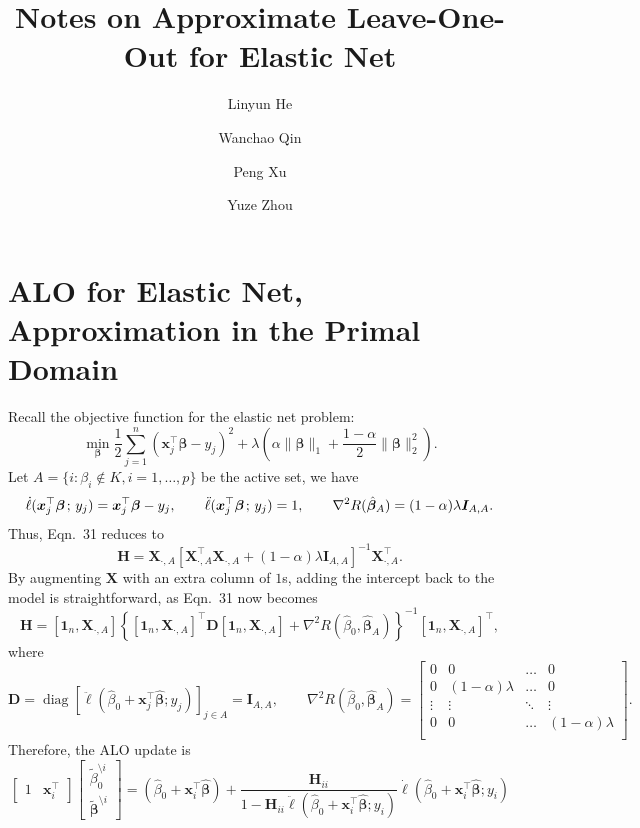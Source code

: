 \documentclass[11pt]{article}
\title{Notes on Approximate Leave-One-Out for Elastic Net}
\author{Linyun He \and Wanchao Qin \and Peng Xu \and Yuze Zhou}
\newcommand{\bx}{\bm{x}}
\newcommand{\bH}{\bm{H}}
\newcommand{\bI}{\bm{I}}
\newcommand{\bX}{\bm{X}}
\newcommand{\bbeta}{\bm{\beta}}
\newcommand{\semicol}{\nobreak\mskip2mu\mathpunct{}\nonscript\mkern-\thinmuskip{;}\mskip6muplus1mu\relax}
\DeclareMathOperator{\diag}{diag}
\newcommand{\refthm}[2]{#1~#2}
\begin{document}
\maketitle

\section{ALO for Elastic Net, Approximation in the Primal Domain}
Recall the objective function for the elastic net problem: \[\min_{\bbeta}\frac{1}{2}\sum_{j=1}^{n}(\bx_j^\top\bbeta-y_j)^2+\lambda\left(\alpha\|\bbeta\|_1+\frac{1-\alpha}{2}\|\bbeta\|_2^2\right).\] Let \(A=\{i:\beta_i\not\in K,i=1,\dotsc,p\}\) be the active set, we have \[\dot{\ell}(\bx_j^\top\bbeta\semicol y_j)=\bx_j^\top\bbeta-y_j,\qquad\ddot{\ell}(\bx_j^\top\bbeta\semicol y_j)=1,\qquad\nabla^2 R(\hat{\bbeta}_A)=(1-\alpha)\lambda\bI_{A,A}.\] Thus, \refthm{Eqn.}{31} reduces to \[\bH=\bX_{\cdot,A}\left[\bX_{\cdot,A}^\top\bX_{\cdot,A}+\left(1-\alpha\right)\lambda\bI_{A,A}\right]^{-1}\bX_{\cdot,A}^\top.\] By augmenting \(\bX\) with an extra column of \(1\)s, adding the intercept back to the model is straightforward, as \refthm{Eqn.}{31} now becomes \[\bm{H}=\left[\bm{1}_n,\bm{X}_{\cdot, A}\right]\left\{\left[\bm{1}_n,\bm{X}_{\cdot, A}\right]^\top\bm{D}\left[\bm{1}_n,\bm{X}_{\cdot, A}\right]+\nabla^2R\left(\hat{\beta}_0,\hat{\bm{\beta}}_A\right)\right\}^{-1}\left[\bm{1}_n,\bm{X}_{\cdot, A}\right]^\top,\] where \[\bm{D}=\diag\left[\ddot{\ell}\left(\hat{\beta}_0+\bm{x}_j^\top\hat{\bm{\beta}};y_j\right)\right]_{j\in A}=\bI_{A,A},\qquad\nabla^2R\left(\hat{\beta}_0,\hat{\bm{\beta}}_A\right)=\begin{bmatrix}
0 & 0 & \dots & 0 \\
0 & (1-\alpha)\lambda & \dots & 0\\
\vdots & \vdots & \ddots & \vdots\\
0 & 0 & \dots & (1-\alpha)\lambda \\
\end{bmatrix}.\] Therefore, the ALO update is \[\begin{bmatrix}
1 & \bm{x}_i^\top\end{bmatrix}
\begin{bmatrix}
\tilde{\beta}_0^{\setminus i} \\
\tilde{\bm{\beta}}^{\setminus i}\end{bmatrix}=(\hat{\beta}_0+\bm{x}_i^\top\hat{\bm{\beta}})+\frac{\bH_{ii}}{1-\bH_{ii}\ddot{\ell}\left(\hat{\beta}_0+\bm{x}_i^\top\hat{\bm{\beta}};y_i\right)}\dot{\ell}\left(\hat{\beta}_0+\bm{x}_i^\top\hat{\bm{\beta}};y_i\right)\]
\end{document}
